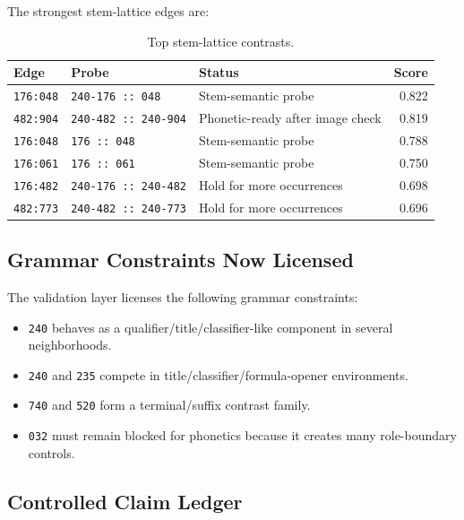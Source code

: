 The strongest stem-lattice edges are:

\begin{table}[htbp]
\centering
\footnotesize
\begin{tabular}{lp{}lr}
\toprule
\textbf{Edge} & \textbf{Probe} & \textbf{Status} & \textbf{Score} \\
\midrule
\texttt{176:048} & \texttt{240-176 :: 048} & Stem-semantic probe & 0.822 \\
\texttt{482:904} & \texttt{240-482 :: 240-904} & Phonetic-ready after image check & 0.819 \\
\texttt{176:048} & \texttt{176 :: 048} & Stem-semantic probe & 0.788 \\
\texttt{176:061} & \texttt{176 :: 061} & Stem-semantic probe & 0.750 \\
\texttt{176:482} & \texttt{240-176 :: 240-482} & Hold for more occurrences & 0.698 \\
\texttt{482:773} & \texttt{240-482 :: 240-773} & Hold for more occurrences & 0.696 \\
\bottomrule
\end{tabular}
\caption{Top stem-lattice contrasts.}
\label{tab:stem-lattice-contrasts}
\end{table}

\subsection{Grammar Constraints Now Licensed}

The validation layer licenses the following grammar constraints:

\begin{itemize}
  \item \texttt{240} behaves as a qualifier/title/classifier-like component in several neighborhoods.
  \item \texttt{240} and \texttt{235} compete in title/classifier/formula-opener environments.
  \item \texttt{740} and \texttt{520} form a terminal/suffix contrast family.
  \item \texttt{032} must remain blocked for phonetics because it creates many role-boundary controls.
\end{itemize}

\subsection{Controlled Claim Ledger}

